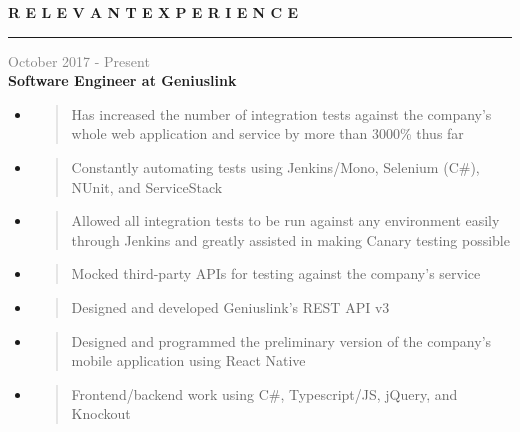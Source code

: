 \documentclass[letterpage]{article}
\begin{document}
\begin{minipage}[t]{0.63\linewidth}
\vspace{0pt}
\textbf{\fontsize{14px}{1px}\selectfont R E L E V A N T \:\:
E X P E R I E N C E}\\
\noindent\rule{4.295in}{0.1pt}

\vspace{7px}
\textcolor{gray}{October 2017 - Present}\\
\textbf{\textsf{Software Engineer at Geniuslink}}
\begin{itemize}[leftmargin=*,labelindent=1mm,labelsep=0mm]
\renewcommand\labelitemi{\rule[1mm]{0.33mm}{0.33mm}}
\renewcommand\labelitemii{$\blacksquare$}
\item
  \begin{quote}
  \raggedright
  Has increased the number of integration tests against the company's whole web
  application and service by more than 3000\% thus far
  \end{quote}
\item
  \begin{quote}
  \raggedright
  Constantly automating tests using Jenkins/Mono,
  Selenium (C\#), NUnit, and ServiceStack
  \end{quote}
\item
  \begin{quote}
  \raggedright
  Allowed all integration tests to be run against any
  environment easily through Jenkins and greatly
  assisted in making Canary testing possible
  \end{quote}
\item
  \begin{quote}
  \raggedright
  Mocked third-party APIs for testing against the company's service
  \end{quote}
\item
  \begin{quote}
  \raggedright
  Designed and developed Geniuslink's REST API v3
  \end{quote}
\item
  \begin{quote}
  \raggedright
  Designed and programmed the preliminary version of the company's mobile
  application using React Native
  \end{quote}
\item
  \begin{quote}
  \raggedright
  Frontend/backend work using C\#, Typescript/JS,
  jQuery, and Knockout
  \end{quote}
\end{itemize}


\end{minipage}
\end{document}
